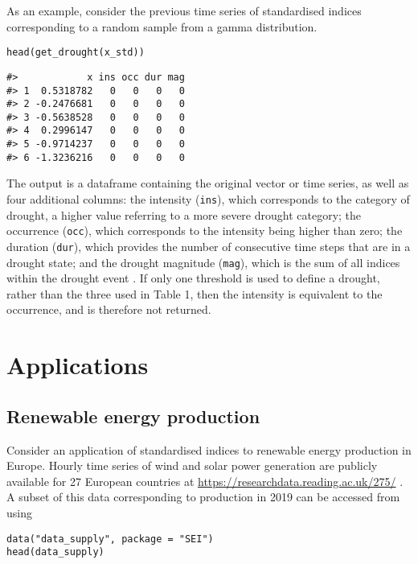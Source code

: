 As an example, consider the previous time series of standardised indices corresponding to a random sample from a gamma distribution.

\begin{verbatim}
head(get_drought(x_std))
\end{verbatim}

\begin{verbatim}
#>            x ins occ dur mag
#> 1  0.5318782   0   0   0   0
#> 2 -0.2476681   0   0   0   0
#> 3 -0.5638528   0   0   0   0
#> 4  0.2996147   0   0   0   0
#> 5 -0.9714237   0   0   0   0
#> 6 -1.3236216   0   0   0   0
\end{verbatim}

The output is a dataframe containing the original vector or time series, as well as four additional columns: the intensity (\texttt{ins}), which corresponds to the category of drought, a higher value referring to a more severe drought category; the occurrence (\texttt{occ}), which corresponds to the intensity being higher than zero; the duration (\texttt{dur}), which provides the number of consecutive time steps that are in a drought state; and the drought magnitude (\texttt{mag}), which is the sum of all indices within the drought event \citep[see][for details]{MckeeEtAl1993}. If only one threshold is used to define a drought, rather than the three used in Table 1, then the intensity is equivalent to the occurrence, and is therefore not returned.

\hypertarget{applications}{%
\section{Applications}\label{applications}}

\hypertarget{renewable-energy-production}{%
\subsection{Renewable energy production}\label{renewable-energy-production}}

Consider an application of standardised indices to renewable energy production in Europe. Hourly time series of wind and solar power generation are publicly available for 27 European countries at \url{https://researchdata.reading.ac.uk/275/} \citep[see][for details]{BloomfieldEtAl2020}. A subset of this data corresponding to production in 2019 can be accessed from  using

\begin{verbatim}
data("data_supply", package = "SEI")
head(data_supply)
\end{verbatim}

